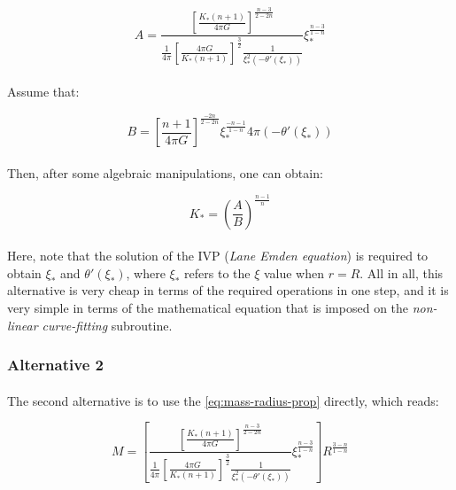 \documentclass[letterpaper,12pt]{article}
\begin{document}
\begin{equation*}
   A =\frac{ \left[\frac{K_* \left(n+1\right)}{4 \pi G}\right]^{\frac{n-3}{2 - 2n}} }{\frac{1}{4 \pi} \left[\frac{4 \pi G}{K_* \left(n+1\right)}\right]^{\frac{3}{2}}  \frac{1}{\xi_*^2\left(-\theta'(\xi_*)\right)}} \xi_*^{\frac{n-3}{1-n}}
\end{equation*}

\paragraph{}Assume that:

\begin{equation*}
    B = \left[\frac{n+1}{4\pi G}\right]^{\frac{-2n}{2-2n}} \xi_*^{\frac{-n-1}{1-n}} 4 \pi \left( -\theta'(\xi_*) \right)
\end{equation*}

\paragraph{} Then, after some algebraic manipulations, one can obtain:

\begin{equation*}
    K_* = \left(\frac{A}{B}\right) ^ {\frac{n-1}{n}}
\end{equation*}

\paragraph{} Here, note that the solution of the IVP (\textit{Lane Emden equation}) is required to obtain $\xi_*$ and $\theta'(\xi_*)$, where $\xi_*$ refers to the $\xi$ value when $r = R$. All in all, this alternative is very cheap in terms of the required operations in one step, and it is very simple in terms of the mathematical equation that is imposed on the \textit{non-linear curve-fitting} subroutine.

\subsubsection{Alternative 2}
\label{sec:Kq_fit_a2}

\paragraph{} The second alternative is to use the \eqref{eq:mass-radius-prop} directly, which reads:

\begin{equation}
    \label{eq:M-R-long}
    M = \left[\frac{ \left[\frac{K_* \left(n+1\right)}{4 \pi G}\right]^{\frac{n-3}{2 - 2n}} }{\frac{1}{4 \pi} \left[\frac{4 \pi G}{K_* \left(n+1\right)}\right]^{\frac{3}{2}}  \frac{1}{\xi_*^2\left(-\theta'(\xi_*)\right)}} \xi_*^{\frac{n-3}{1-n}} \right] R^{\frac{3-n}{1-n}}
\end{equation}
\end{document}
